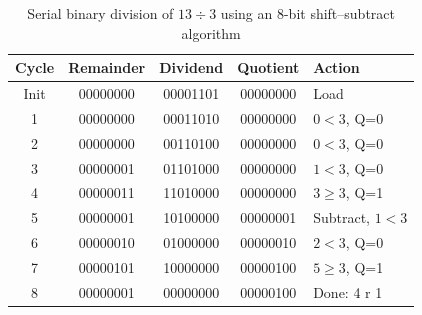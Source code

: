 \documentclass[a4paper,12pt]{article}
\begin{document}
\begin{table}[h]
\centering
\begin{tabular}{c c c c l}
\hline
\textbf{Cycle} & \textbf{Remainder} & \textbf{Dividend} & \textbf{Quotient} & \textbf{Action} \\
\hline
Init & 00000000 & 00001101 & 00000000 & Load \\
1 & 00000000 & 00011010 & 00000000 & $0<3$, Q=0 \\
2 & 00000000 & 00110100 & 00000000 & $0<3$, Q=0 \\
3 & 00000001 & 01101000 & 00000000 & $1<3$, Q=0 \\
4 & 00000011 & 11010000 & 00000000 & $3\ge3$, Q=1 \\
5 & 00000001 & 10100000 & 00000001 & Subtract, $1<3$ \\
6 & 00000010 & 01000000 & 00000010 & $2<3$, Q=0 \\
7 & 00000101 & 10000000 & 00000100 & $5\ge3$, Q=1 \\
8 & 00000001 & 00000000 & 00000100 & Done: 4 r 1 \\
\hline
\end{tabular}
\caption{Serial binary division of $13 \div 3$ using an 8-bit shift--subtract algorithm}
\label{tab:serial_div}
\end{table}
\end{document}

